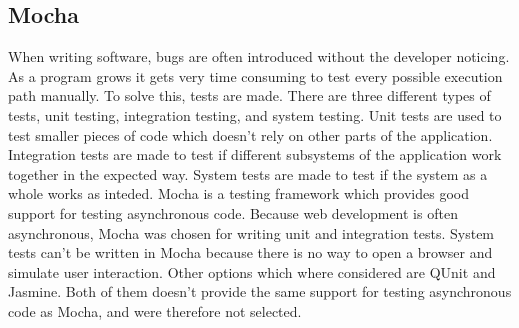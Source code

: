 \subsection{Mocha}
When writing software, bugs are often introduced without the developer noticing. As a program grows it gets very time consuming to test every possible execution path manually. To solve this, tests are made. There are three different types of tests, unit testing, integration testing, and system testing. Unit tests are used to test smaller pieces of code which doesn't rely on other parts of the application. Integration tests are made to test if different subsystems of the application work together in the expected way. System tests are made to test if the system as a whole works as inteded. Mocha\cite{mocha} is a testing framework which provides good support for testing asynchronous code. Because web development is often asynchronous, Mocha was chosen for writing unit and integration tests. System tests can't be written in Mocha because there is no way to open a browser and simulate user interaction. Other options which where considered are QUnit\cite{qunit} and Jasmine\cite{jasmine}. Both of them doesn't provide the same support for testing asynchronous code as Mocha, and were therefore not selected.